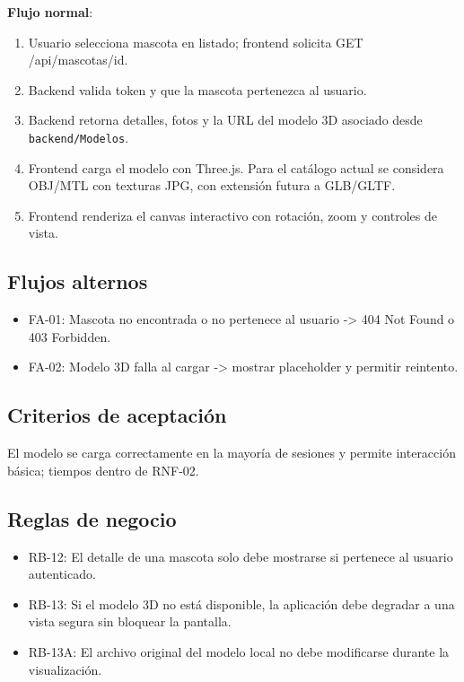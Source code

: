 \documentclass[12pt,a4paper]{article}
\begin{document}
\vspace{0.5em}
\textbf{Flujo normal}:
\begin{enumerate}[leftmargin=*]
    \item Usuario selecciona mascota en listado; frontend solicita GET /api/mascotas/{id}.
    \item Backend valida token y que la mascota pertenezca al usuario.
    \item Backend retorna detalles, fotos y la URL del modelo 3D asociado desde \texttt{backend/Modelos}.
    \item Frontend carga el modelo con Three.js. Para el cat\'alogo actual se considera OBJ/MTL con texturas JPG, con extensi\'on futura a GLB/GLTF.
    \item Frontend renderiza el canvas interactivo con rotaci\'on, zoom y controles de vista.
\end{enumerate}

\subsection*{Flujos alternos}
\begin{itemize}[leftmargin=*]
    \item FA-01: Mascota no encontrada o no pertenece al usuario -> 404 Not Found o 403 Forbidden.
    \item FA-02: Modelo 3D falla al cargar -> mostrar placeholder y permitir reintento.
\end{itemize}

\subsection*{Criterios de aceptaci\'on}
El modelo se carga correctamente en la mayoría de sesiones y permite interacci\'on b\'asica; tiempos dentro de RNF-02.

\subsection*{Reglas de negocio}
\begin{itemize}[leftmargin=*]
    \item RB-12: El detalle de una mascota solo debe mostrarse si pertenece al usuario autenticado.
    \item RB-13: Si el modelo 3D no est\'a disponible, la aplicaci\'on debe degradar a una vista segura sin bloquear la pantalla.
    \item RB-13A: El archivo original del modelo local no debe modificarse durante la visualizaci\'on.
\end{itemize}
\end{document}
